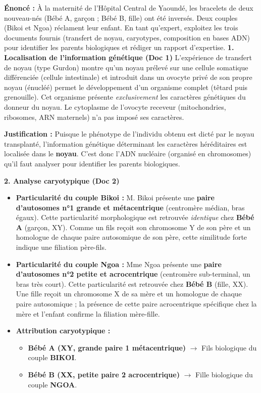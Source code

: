 \documentclass[11pt]{article}
\newcounter{popsec}
\newcounter{popsub}
\newcommand{\courssub}[1]{%
  \stepcounter{popsub}%
  \par\vspace{9pt}\noindent{\popxbold\fontsize{11.5}{13}\selectfont\color{popink}{\color{poporange}\thepopsec.\thepopsub}\hspace{6pt}#1}\par\nopagebreak\vspace{4pt}
}
\begin{document}
\courssub{Démarche et corrigé commenté}
\begin{exoresolu}
\textbf{Énoncé :} À la maternité de l'Hôpital Central de Yaoundé, les bracelets de deux nouveau-nés (Bébé A, garçon ; Bébé B, fille) ont été inversés. Deux couples (Bikoi et Ngoa) réclament leur enfant. En tant qu'expert, exploitez les trois documents fournis (transfert de noyau, caryotypes, composition en bases ADN) pour identifier les parents biologiques et rédiger un rapport d'expertise.
\tcblower
\textbf{1. Localisation de l'information génétique (Doc 1)}
L'expérience de transfert de noyau (type Gurdon) montre qu'un noyau prélevé sur une cellule somatique différenciée (cellule intestinale) et introduit dans un ovocyte privé de son propre noyau (énucléé) permet le développement d'un organisme complet (têtard puis grenouille). Cet organisme présente \emph{exclusivement} les caractères génétiques du donneur du noyau. Le cytoplasme de l'ovocyte receveur (mitochondries, ribosomes, ARN maternels) n'a pas imposé ses caractères.
\par \textbf{Justification :} Puisque le phénotype de l'individu obtenu est dicté par le noyau transplanté, l'information génétique déterminant les caractères héréditaires est localisée dans le \textbf{noyau}. C'est donc l'ADN nucléaire (organisé en chromosomes) qu'il faut analyser pour identifier les parents biologiques.

\textbf{2. Analyse caryotypique (Doc 2)}
\begin{itemize}
    \item \textbf{Particularité du couple Bikoi :} M. Bikoi présente une \textbf{paire d'autosomes n°1 grande et métacentrique} (centromère médian, bras égaux). Cette particularité morphologique est retrouvée \emph{identique} chez \textbf{Bébé A} (garçon, XY). Comme un fils reçoit son chromosome Y de son père et un homologue de chaque paire autosomique de son père, cette similitude forte indique une filiation père-fils.
    \item \textbf{Particularité du couple Ngoa :} Mme Ngoa présente une \textbf{paire d'autosomes n°2 petite et acrocentrique} (centromère sub-terminal, un bras très court). Cette particularité est retrouvée chez \textbf{Bébé B} (fille, XX). Une fille reçoit un chromosome X de sa mère et un homologue de chaque paire autosomique ; la présence de cette paire acrocentrique spécifique chez la mère et l'enfant confirme la filiation mère-fille.
    \item \textbf{Attribution caryotypique :}
    \begin{itemize}
        \item \textbf{Bébé A (XY, grande paire 1 métacentrique)} $\to$ Fils biologique du couple \textbf{BIKOI}.
        \item \textbf{Bébé B (XX, petite paire 2 acrocentrique)} $\to$ Fille biologique du couple \textbf{NGOA}.
    \end{itemize}
\end{itemize}


\end{exoresolu}
\end{document}
